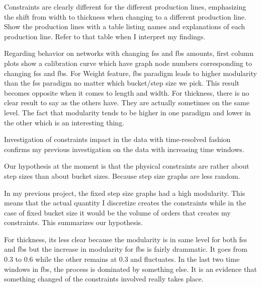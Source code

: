 {Constraints are clearly different for the different production lines, emphasizing the shift from width to thickness when changing to a different production line. 
Show the production lines with a table listing names and explanations of each production line. Refer to that table when I interpret my findings.
}




{\color{red}
	Regarding behavior on networks with changing fss and fbs amounts, first column plots show a calibration curve which have graph node numbers corresponding to changing fss and fbs. For Weight feature, fbs paradigm leads to higher modularity than the fss paradigm no matter which bucket/step size we pick. This result becomes opposite when it comes to length and width. For thickness, there is no clear result to say as the others have. They are actually sometimes on the same level. The fact that modularity tends to be higher in one paradigm and lower in the other which is an interesting thing.
	
	Investigation of constraints impact in the data with time-resolved fashion confirms my previous investigation on the data with increasing time windows.
	
	Our hypothesis at the moment is that the physical constraints are rather about step sizes than about bucket sizes. Because step size graphs are less random.
	
	In my previous project, the fixed step size graphs had a high modularity. This means that the actual quantity I discretize creates the constraints while in the case of fixed bucket size it would be the volume of orders that creates my constraints. This summarizes our hypothesis. 
	
	
	For thickness, its less clear because the modularity is in same level for both fss and fbs but the increase in modularity for fbs is fairly drammatic. It goes from 0.3 to 0.6 while the other remains at 0.3 and fluctuates. In the last two time windows in fbs, the process is dominated by something else. It is an evidence that something changed of the constraints involved really takes place.
	
}
